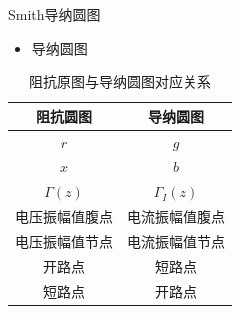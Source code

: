 \begin{frame}{Smith导纳圆图}
  \begin{itemize}
    \item 导纳圆图
  \end{itemize}
  \centering
  \begin{table}
    \caption{阻抗原图与导纳圆图对应关系}
    \begin{tabular}{|c|c|}
      \hline
      \textbf{阻抗圆图} & \textbf{导纳圆图} \\ \hline
      $r$           & $g$           \\ \hline
      $x$           & $b$           \\ \hline
      $\Gamma(z)$   & $\Gamma_I(z)$ \\ \hline
      电压振幅值腹点       & 电流振幅值腹点       \\ \hline
      电压振幅值节点       & 电流振幅值节点       \\ \hline
      开路点           & 短路点           \\ \hline
      短路点           & 开路点           \\
      \hline
    \end{tabular}
  \end{table}
\end{frame}

